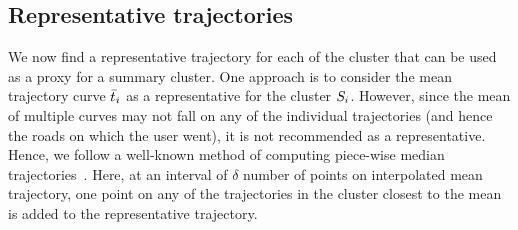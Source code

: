 \subsection{Representative trajectories}
We now find a representative trajectory for each of the cluster that can be used as a proxy for a summary cluster. One approach is to consider the mean trajectory curve $\bar{t}_i$ as a representative for the cluster $S_i$. However, since the mean of multiple curves may not fall on any of the individual trajectories (and hence the roads on which the user went), it is not recommended as a representative. Hence, we follow a well-known method of computing piece-wise median trajectories~\cite{medianTraj}. Here, at an interval of $\delta$ number of points on interpolated mean trajectory, one point on any of the trajectories in the cluster closest to the mean is added to the representative trajectory. 

